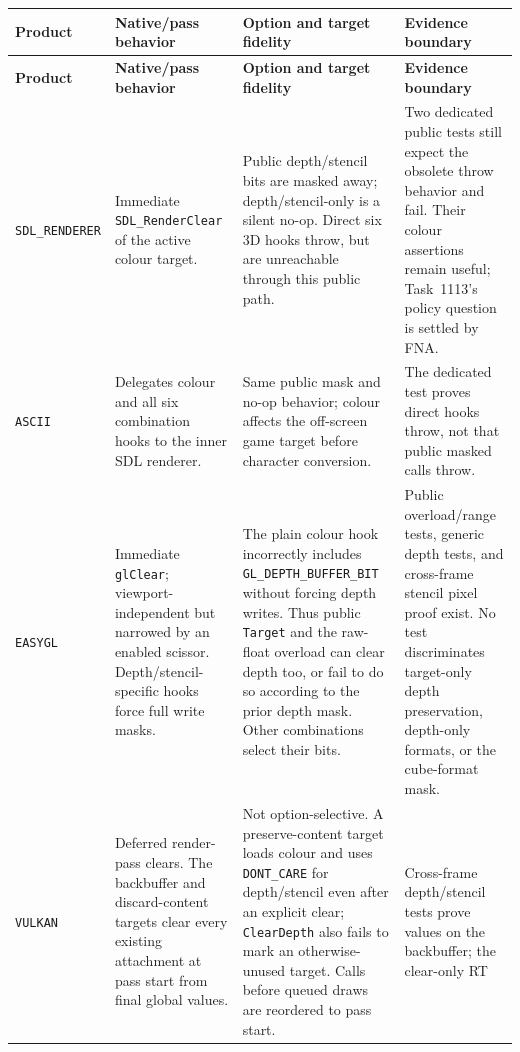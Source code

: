 \begingroup
\footnotesize
\setlength{\tabcolsep}{3pt}
\renewcommand{\arraystretch}{1.12}
\begin{longtable}{@{}p{}p{}p{}p{}@{}}
\toprule
\textbf{Product} & \textbf{Native/pass behavior} & \textbf{Option and target fidelity} &
\textbf{Evidence boundary} \\
\midrule
\endfirsthead
\toprule
\textbf{Product} & \textbf{Native/pass behavior} & \textbf{Option and target fidelity} &
\textbf{Evidence boundary} \\
\midrule
\endhead
\texttt{SDL\_\allowbreak{}RENDERER}
  & Immediate \texttt{SDL\_RenderClear} of the active colour target.
  & Public depth/stencil bits are masked away; depth/stencil-only is a silent no-op.
    Direct six 3D hooks throw, but are unreachable through this public path.
  & Two dedicated public tests still expect the obsolete throw behavior and fail. Their
    colour assertions remain useful; Task~1113's policy question is settled by FNA. \\
\texttt{ASCII}
  & Delegates colour and all six combination hooks to the inner SDL renderer.
  & Same public mask and no-op behavior; colour affects the off-screen game target before
    character conversion.
  & The dedicated test proves direct hooks throw, not that public masked calls throw. \\
\texttt{EASYGL}
  & Immediate \texttt{glClear}; viewport-independent but narrowed by an enabled scissor.
    Depth/stencil-specific hooks force full write masks.
  & The plain colour hook incorrectly includes \texttt{GL\_DEPTH\_BUFFER\_BIT} without forcing
    depth writes. Thus public \texttt{Target} and the raw-float overload can clear depth too,
    or fail to do so according to the prior depth mask. Other combinations select their bits.
  & Public overload/range tests, generic depth tests, and cross-frame stencil pixel proof
    exist. No test discriminates target-only depth preservation, depth-only formats, or the
    cube-format mask. \\
\texttt{VULKAN}
  & Deferred render-pass clears. The backbuffer and discard-content targets clear every
    existing attachment at pass start from final global values.
  & Not option-selective. A preserve-content target loads colour and uses
    \texttt{DONT\_CARE} for depth/stencil even after an explicit clear; \texttt{ClearDepth}
    also fails to mark an otherwise-unused target. Calls before queued draws are reordered to
    pass start.
  & Cross-frame depth/stencil tests prove values on the backbuffer; the clear-only RT

\end{longtable}
